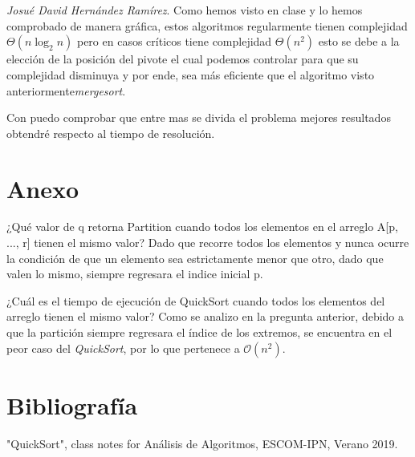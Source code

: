 \documentclass[12pt,twoside]{article}
\begin{document}
\\\\\textit{Josu\'e David Hern\'andez Ram\'irez}. Como hemos visto en clase y lo hemos comprobado de manera gr\'afica, estos algoritmos regularmente tienen complejidad $\Theta(n\log_2 n)$ pero en casos cr\'iticos tiene complejidad $\Theta(n^2)$ esto se debe a la elección de la posición del pivote el cual podemos controlar para que su complejidad disminuya y por ende, sea más eficiente que el algoritmo visto anteriormente\textit{mergesort}.

Con puedo comprobar que entre mas se divida el problema mejores resultados obtendr\'e respecto al tiempo de resoluci\'on.
 
\newpage
\vfill
\clearpage
\section{Anexo}
¿Qu\'e valor de q retorna Partition cuando todos los elementos en el arreglo A[p, ..., r]
tienen el mismo valor?
Dado que recorre todos los elementos y nunca ocurre la condici\'on de que un elemento sea estrictamente menor que otro, dado que valen lo mismo, siempre regresara el indice inicial p.

¿Cu\'al es el tiempo de ejecuci\'on de QuickSort cuando todos los elementos del arreglo
tienen el mismo valor?
Como se analizo en la pregunta anterior, debido a que la partici\'on siempre regresara el \'indice de los extremos, se encuentra en el peor caso del \textit{QuickSort}, por lo que pertenece a $\mathcal{O}(n^2)$.

\section{Bibliograf\'ia}
"QuickSort", class notes for An\'alisis de Algoritmos, ESCOM-IPN, Verano 2019.
\end{document}
